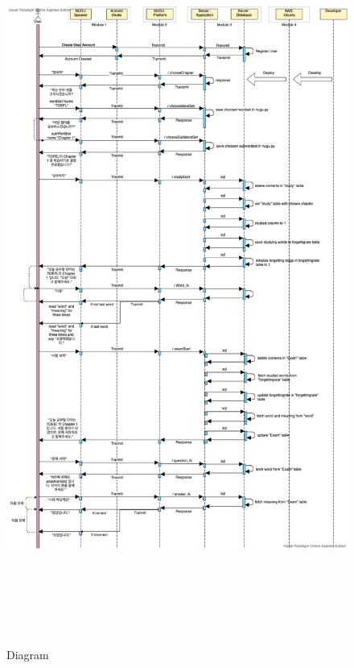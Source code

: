 \documentclass[conference]{IEEEtran}
\begin{document}
    
\begin{figure}[h]
    \centering
    \hfill
    \includegraphics[width=\textwidth, height=24cm]{diagram2.png}
    \hfill
    \caption{Diagram}
\end{figure}
\end{document}
